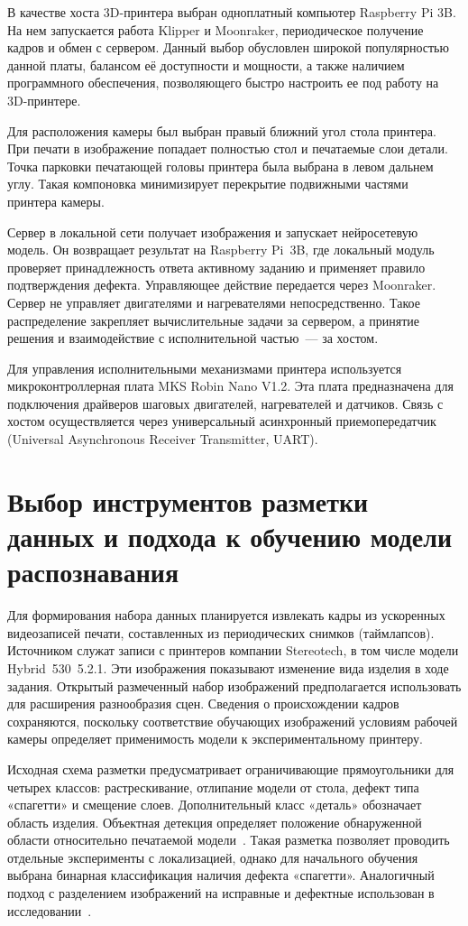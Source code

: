 В качестве хоста 3D-принтера выбран одноплатный компьютер Raspberry Pi 3B. На нем запускается работа Klipper и Moonraker, периодическое получение кадров и обмен с сервером. Данный выбор обусловлен широкой популярностью данной платы, балансом её доступности и мощности, а также наличием программного обеспечения, позволяющего быстро настроить ее под работу на 3D-принтере.

Для расположения камеры был выбран правый ближний угол стола принтера. При печати в изображение попадает полностью стол и печатаемые слои детали. Точка парковки печатающей головы принтера была выбрана в левом дальнем углу. Такая компоновка минимизирует перекрытие подвижными частями принтера камеры.

Сервер в локальной сети получает изображения и запускает нейросетевую модель. Он возвращает результат на Raspberry Pi~3B, где локальный модуль проверяет принадлежность ответа активному заданию и применяет правило подтверждения дефекта. Управляющее действие передается через Moonraker. Сервер не управляет двигателями и нагревателями непосредственно. Такое распределение закрепляет вычислительные задачи за сервером, а принятие решения и взаимодействие с исполнительной частью~--- за хостом.

Для управления исполнительными механизмами принтера используется микроконтроллерная плата MKS Robin Nano V1.2. Эта плата предназначена для подключения драйверов шаговых двигателей, нагревателей и датчиков. Связь с хостом осуществляется через универсальный асинхронный приемопередатчик (Universal Asynchronous Receiver Transmitter, UART).

\section{Выбор инструментов разметки данных и подхода к обучению модели распознавания}

Для формирования набора данных планируется извлекать кадры из ускоренных видеозаписей печати, составленных из периодических снимков (таймлапсов). Источником служат записи с принтеров компании Stereotech, в том числе модели Hybrid~530~5.2.1. Эти изображения показывают изменение вида изделия в ходе задания. Открытый размеченный набор изображений предполагается использовать для расширения разнообразия сцен. Сведения о происхождении кадров сохраняются, поскольку соответствие обучающих изображений условиям рабочей камеры определяет применимость модели к экспериментальному принтеру.

Исходная схема разметки предусматривает ограничивающие прямоугольники для четырех классов: растрескивание, отлипание модели от стола, дефект типа «спагетти» и смещение слоев. Дополнительный класс «деталь» обозначает область изделия. Объектная детекция определяет положение обнаруженной области относительно печатаемой модели~\cite{брехт2022применение}. Такая разметка позволяет проводить отдельные эксперименты с локализацией, однако для начального обучения выбрана бинарная классификация наличия дефекта «спагетти». Аналогичный подход с разделением изображений на исправные и дефектные использован в исследовании~\cite{kim2020image}.

